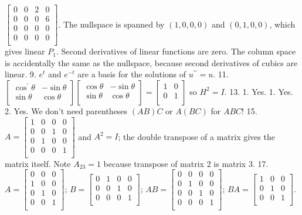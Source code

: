 \(\begin{bmatrix}0&0&2&0\\ 0&0&0&6\\ 0&0&0&0\\ 0&0&0&0\\ \end{bmatrix}\). The nullspace is spanned by \((1,0,0,0)\) and \((0,1,0,0)\), which gives linear \(P_{1}\). Second derivatives of linear functions are zero. The column space is accidentally the same as the nullspace, because second derivatives of cubics are linear.
9. \(e^{t}\) and \(e^{-t}\) are a basis for the solutions of \(u^{\prime\prime}=u\).
11. \(\begin{bmatrix}\cos^{\prime}\theta&-\sin\theta\\ \sin\theta&\cos\theta\\ \end{bmatrix}\begin{bmatrix}\cos\theta&-\sin\theta\\ \sin\theta&\cos\theta\\ \end{bmatrix}=\begin{bmatrix}1&0\\ 0&1\\ \end{bmatrix}\) so \(H^{2}=I\).
13. 1. Yes. 1. Yes. 2. Yes. We don't need parentheses \((AB)C\) or \(A(BC)\) for \(ABC\)!
15. \(A=\begin{bmatrix}1&0&0&0\\ 0&0&1&0\\ 0&1&0&0\\ 0&0&0&1\\ \end{bmatrix}\) and \(A^{2}=I\); the double transpose of a matrix gives the matrix itself. Note \(A_{23}=1\) because transpose of matrix 2 is matrix 3.
17. \(A=\begin{bmatrix}0&0&0\\ 1&0&0\\ 0&1&0\\ 0&0&1\\ \end{bmatrix}\); \(B=\begin{bmatrix}0&1&0&0\\ 0&0&1&0\\ 0&0&0&1\\ \end{bmatrix}\); \(AB=\begin{bmatrix}0&0&0&0\\ 0&1&0&0\\ 0&0&1&0\\ 0&0&0&1\\ \end{bmatrix}\); \(BA=\begin{bmatrix}1&0&0\\ 0&1&0\\ 0&0&1\\ \end{bmatrix}\).
